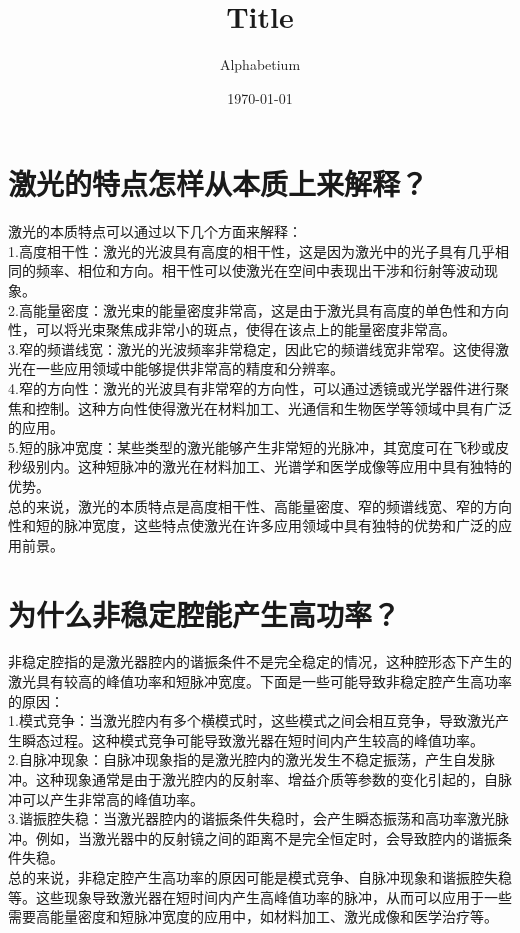 \documentclass[12pt, a4paper, oneside]{article}
\title{Title}
\date{\today}
\author{Alphabetium}
\begin{document}
\begin{spacing}{2.0}
\tableofcontents
\maketitle

\section{激光的特点怎样从本质上来解释？}
激光的本质特点可以通过以下几个方面来解释：\\

1.高度相干性：激光的光波具有高度的相干性，这是因为激光中的光子具有几乎相同的频率、相位和方向。相干性可以使激光在空间中表现出干涉和衍射等波动现象。\\

2.高能量密度：激光束的能量密度非常高，这是由于激光具有高度的单色性和方向性，可以将光束聚焦成非常小的斑点，使得在该点上的能量密度非常高。\\

3.窄的频谱线宽：激光的光波频率非常稳定，因此它的频谱线宽非常窄。这使得激光在一些应用领域中能够提供非常高的精度和分辨率。\\

4.窄的方向性：激光的光波具有非常窄的方向性，可以通过透镜或光学器件进行聚焦和控制。这种方向性使得激光在材料加工、光通信和生物医学等领域中具有广泛的应用。
\\
5.短的脉冲宽度：某些类型的激光能够产生非常短的光脉冲，其宽度可在飞秒或皮秒级别内。这种短脉冲的激光在材料加工、光谱学和医学成像等应用中具有独特的优势。
\\
总的来说，激光的本质特点是高度相干性、高能量密度、窄的频谱线宽、窄的方向性和短的脉冲宽度，这些特点使激光在许多应用领域中具有独特的优势和广泛的应用前景。

\section{为什么非稳定腔能产生高功率？}
非稳定腔指的是激光器腔内的谐振条件不是完全稳定的情况，这种腔形态下产生的激光具有较高的峰值功率和短脉冲宽度。下面是一些可能导致非稳定腔产生高功率的原因：\\

1.模式竞争：当激光腔内有多个横模式时，这些模式之间会相互竞争，导致激光产生瞬态过程。这种模式竞争可能导致激光器在短时间内产生较高的峰值功率。
\\
2.自脉冲现象：自脉冲现象指的是激光腔内的激光发生不稳定振荡，产生自发脉冲。这种现象通常是由于激光腔内的反射率、增益介质等参数的变化引起的，自脉冲可以产生非常高的峰值功率。
\\
3.谐振腔失稳：当激光器腔内的谐振条件失稳时，会产生瞬态振荡和高功率激光脉冲。例如，当激光器中的反射镜之间的距离不是完全恒定时，会导致腔内的谐振条件失稳。
\\
总的来说，非稳定腔产生高功率的原因可能是模式竞争、自脉冲现象和谐振腔失稳等。这些现象导致激光器在短时间内产生高峰值功率的脉冲，从而可以应用于一些需要高能量密度和短脉冲宽度的应用中，如材料加工、激光成像和医学治疗等。






\end{spacing}
\end{document}
